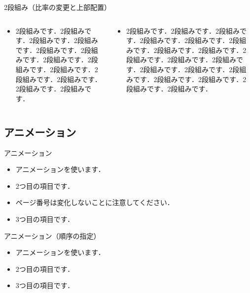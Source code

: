 \begin{frame}{2段組み（比率の変更と上部配置）}
  \begin{columns}[t]
    \begin{column}{0.3\textwidth}
      \begin{itemize}
        \item 2段組みです．2段組みです．2段組みです．2段組みです．2段組みです．2段組みです．2段組みです．2段組みです．2段組みです．2段組みです．2段組みです．2段組みです．2段組みです．
      \end{itemize}
    \end{column}
    \begin{column}{0.7\textwidth}
      \begin{itemize}
        \item 2段組みです．2段組みです．2段組みです．2段組みです．2段組みです．2段組みです．2段組みです．2段組みです．2段組みです．2段組みです．2段組みです．2段組みです．2段組みです．2段組みです．2段組みです．2段組みです．2段組みです．2段組みです．
      \end{itemize}
    \end{column}
  \end{columns}
\end{frame}

\subsection{アニメーション}

\begin{frame}{アニメーション}
  \begin{itemize}
    \item アニメーションを使います．
    \pause
    \item 2つ目の項目です．
    \item ページ番号は変化しないことに注意してください．
    \pause
    \item 3つ目の項目です．
  \end{itemize}
\end{frame}

\begin{frame}{アニメーション（順序の指定）}
  \begin{itemize}
    \item<1-> アニメーションを使います．
    \item<3-> 2つ目の項目です．
    \item<2-> 3つ目の項目です．
  \end{itemize}
\end{frame}

